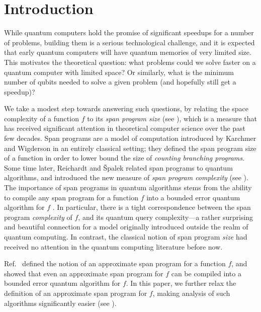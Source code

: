 \documentclass{toc}
\begin{document}
%
%
%



\section{Introduction}

While quantum computers hold the promise of significant speedups for a number of problems, building them is a serious technological challenge, and it is expected that early quantum computers will have quantum memories of very limited size. This motivates the theoretical question: what problems could we solve faster on a quantum computer with limited space? Or similarly, what is the minimum number of qubits needed to solve a given problem (and hopefully still get a speedup)?  %

We take a modest step towards answering such questions, by relating the space complexity of a function $f$ to its \emph{span program size} (see ), which is a measure that has received significant attention in theoretical computer science over the past few decades. Span programs are a model of computation introduced by Karchmer and Wigderson \cite{KW93} in an entirely classical setting; they defined the span program size of a function in order to lower bound the size of \emph{counting branching programs}. Some time later, Reichardt and \v{S}palek \cite{RS12} related span programs to quantum algorithms, and introduced the new measure of \emph{span program complexity} (see ). The importance of span programs in quantum algorithms stems from the ability to compile any span program for a function $f$ into a bounded error quantum algorithm for $f$ \cite{Rei09}. In particular, there is a tight correspondence between the span program \emph{complexity} of $f$, and its quantum query
complexity---a rather surprising and beautiful connection for a model originally introduced outside the realm of quantum computing. In contrast, the classical notion of span program \emph{size} had received no attention in the quantum computing literature before now. 

Ref.~\cite{IJ15} defined the notion of an approximate span program for a function $f$, and showed that even an approximate span program for $f$ can be compiled into a bounded error quantum algorithm for $f$. In this
%
paper,  %
we further relax the definition of an approximate span program for $f$, making analysis of such algorithms significantly easier (see ).
\end{document}
